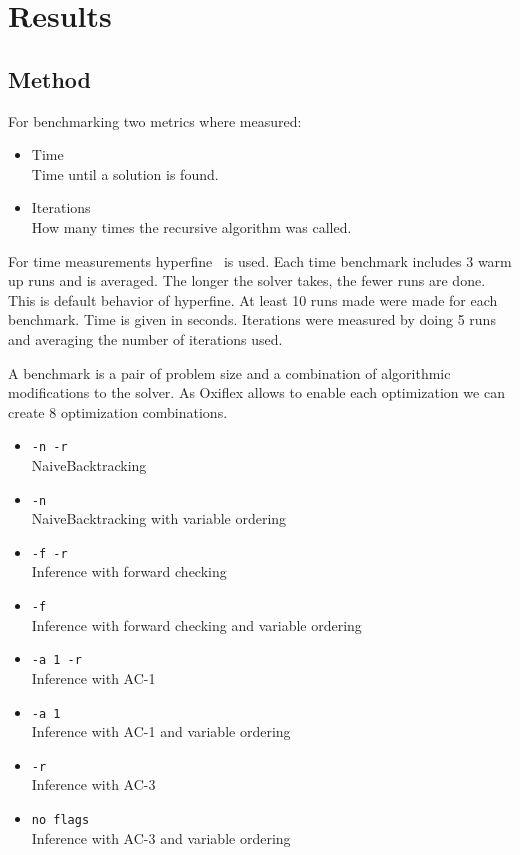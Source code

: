 
\chapter{Results} \label{chap:result}

\section{Method}

For benchmarking two metrics where measured:

\begin{itemize}
	\item Time \\
	      Time until a solution is found.
	\item Iterations \\
	      How many times the recursive algorithm was called.
\end{itemize}

For time measurements hyperfine~\cite{hyperfine:2023} is used. Each time benchmark includes 3 warm up runs and is averaged. The longer the solver takes, the fewer runs are done. This is default behavior of hyperfine. At least 10 runs made were made for each benchmark. Time is given in seconds. Iterations were measured by doing 5 runs and averaging the number of iterations used.

A benchmark is a pair of problem size and a combination of algorithmic modifications to the solver. As Oxiflex allows to enable each optimization we can create 8 optimization combinations.

\begin{itemize}
	\item \verb|-n -r| \\
	      NaiveBacktracking
	\item \verb|-n| \\
	      NaiveBacktracking with variable ordering
	\item \verb|-f -r| \\
	      Inference with forward checking
	\item \verb|-f| \\
	      Inference with forward checking and variable ordering
	\item \verb|-a 1 -r| \\
	      Inference with AC-1
	\item \verb|-a 1| \\
	      Inference with AC-1 and variable ordering
	\item \verb|-r| \\
	      Inference with AC-3
	\item \verb|no flags| \\
	      Inference with AC-3 and variable ordering
\end{itemize}

